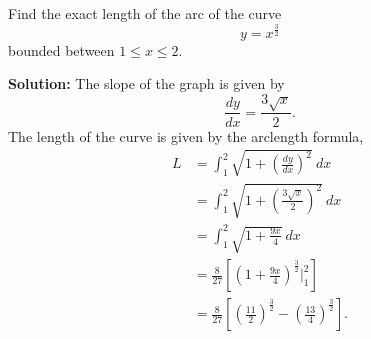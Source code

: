 \documentclass[11pt]{exam}
\begin{document}
\begin{questions}
\question[3] Find the exact length of the arc of the curve
\begin{equation*}
y=x^\frac{3}{2}
\end{equation*}
bounded between $1 \leq x \leq 2$. 

\textbf{Solution:}
The slope of the graph is given by 
\begin{equation*}
\frac{dy}{dx}=\frac{3\sqrt{x}}{2}.
\end{equation*}
The length of the curve is given by the arclength formula, 
\begin{align*}
L & = \int_{1}^{2}\sqrt{1+\left(\frac{dy}{dx}\right)^2} \ dx \\
& = \int_{1}^{2} \sqrt{1+\left(\frac{3\sqrt{x}}{2}\right)^2} \ dx\\
& = \int_{1}^{2} \sqrt{1+\frac{9x}{4}} \ dx \\
& =  \frac{8}{27}\left[\left(1+\frac{9x}{4}\right)^{\frac{3}{2}} \Big|_{1}^{2} \right] \\ 
& = \frac{8}{27}\left[\left(\frac{11}{2}\right)^{\frac{3}{2}} - \left(\frac{13}{4}\right)^{\frac{3}{2}}\right].
\end{align*}
\addpoints
\end{questions}
\end{document}
